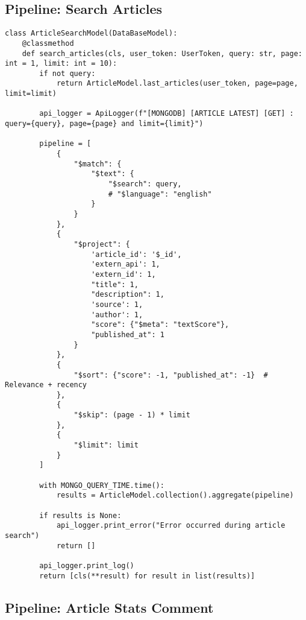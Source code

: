 \subsection{Pipeline: Search Articles}\label{subsec:pipeline:-search-articles}

\begin{lstlisting}[style=pythonstyle,label={lst:pipeline-search-articles},caption={Pipeline search articles}]
class ArticleSearchModel(DataBaseModel):
    @classmethod
    def search_articles(cls, user_token: UserToken, query: str, page: int = 1, limit: int = 10):
        if not query:
            return ArticleModel.last_articles(user_token, page=page, limit=limit)

        api_logger = ApiLogger(f"[MONGODB] [ARTICLE LATEST] [GET] : query={query}, page={page} and limit={limit}")

        pipeline = [
            {
                "$match": {
                    "$text": {
                        "$search": query,
                        # "$language": "english"
                    }
                }
            },
            {
                "$project": {
                    'article_id': '$_id',
                    'extern_api': 1,
                    'extern_id': 1,
                    "title": 1,
                    "description": 1,
                    'source': 1,
                    'author': 1,
                    "score": {"$meta": "textScore"},
                    "published_at": 1
                }
            },
            {
                "$sort": {"score": -1, "published_at": -1}  # Relevance + recency
            },
            {
                "$skip": (page - 1) * limit
            },
            {
                "$limit": limit
            }
        ]

        with MONGO_QUERY_TIME.time():
            results = ArticleModel.collection().aggregate(pipeline)

        if results is None:
            api_logger.print_error("Error occurred during article search")
            return []

        api_logger.print_log()
        return [cls(**result) for result in list(results)]
\end{lstlisting}


\subsection{Pipeline: Article Stats Comment}\label{subsec:pipeline:-article-stats-comment}

